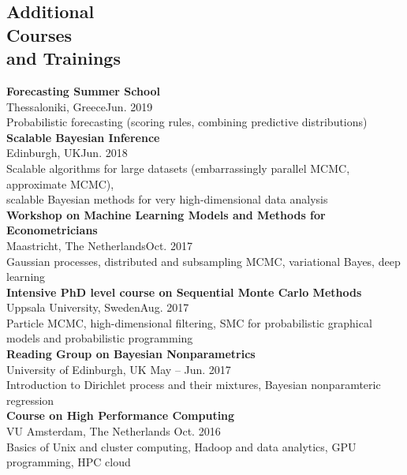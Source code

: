 \documentclass[margin,line]{resume}
\begin{document}
\begin{resume}
   \section{\mysidestyle Additional\\ Courses \\and Trainings} 
	\textbf{Forecasting Summer School}\\
        Thessaloniki, Greece\hfill Jun. 2019\\
        Probabilistic forecasting (scoring rules, combining predictive distributions)\vspace{1.5mm} \\	
	\textbf{Scalable Bayesian Inference}\\
        Edinburgh, UK\hfill Jun. 2018\\
        Scalable algorithms for large datasets (embarrassingly parallel MCMC, approximate MCMC),\\ scalable Bayesian methods for very high-dimensional data analysis\vspace{1.5mm} \\	
	\textbf{Workshop on Machine Learning Models and Methods for Econometricians}\\
        Maastricht, The Netherlands\hfill Oct. 2017\\
        Gaussian processes, distributed and subsampling MCMC, variational Bayes,  deep learning\vspace{1.5mm} \\	
	\textbf{Intensive PhD level course on Sequential Monte Carlo Methods}\\
        Uppsala University, Sweden\hfill Aug. 2017\\
        Particle MCMC, high-dimensional filtering, SMC for probabilistic graphical models and probabilistic programming\vspace{1.5mm} \\   
	\textbf{Reading Group on Bayesian Nonparametrics}\\
        University of Edinburgh, UK \hfill May -- Jun. 2017\\
        Introduction to Dirichlet process and their mixtures, Bayesian nonparamteric regression\vspace{1.5mm} \\
	\textbf{Course on High Performance Computing}\\
        VU Amsterdam, The Netherlands \hfill Oct. 2016\\
        Basics of Unix and cluster computing,  Hadoop and data analytics, GPU programming, HPC cloud\vspace{1.5mm} \\

\end{resume}
\end{document}
